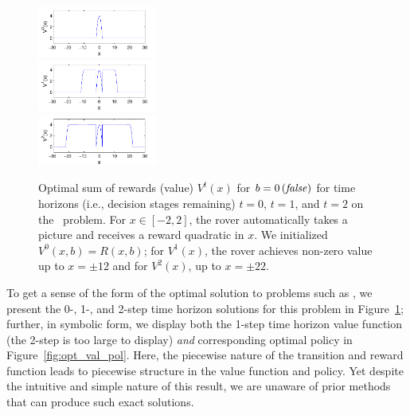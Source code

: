 \begin{figure}[t!]
\centering
\includegraphics[width=0.35\textwidth]{Figures1/v1_mr.pdf}\\
\vspace{-1mm}
\includegraphics[width=0.35\textwidth]{Figures1/v2_mr.pdf}\\
\vspace{-1mm}
\includegraphics[width=0.35\textwidth]{Figures1/v3_mr.pdf}
\vspace{-3mm}
\caption{\footnotesize Optimal sum of rewards (value) 
$V^t(x)$ for $b = 0 \, 
(\mathit{false})$ for time horizons (i.e., decision stages remaining) $t=0$,
$t=1$, and $t=2$ on the \MarsRover\ problem.  For $x \in [-2,2]$, the
rover automatically takes a picture and receives a reward quadratic in
$x$.  We initialized $V^0(x,b) = R(x,b)$; for $V^1(x)$, the rover achieves
non-zero value up to $x = \pm 12$ and for 
$V^2(x)$, up to $x = \pm 22$.}
\label{fig:opt_graph}
\vspace{-3mm}
\end{figure}

To get a sense of the form of the optimal solution to problems such as
\MarsRover, we present the 0-, 1-, and 2-step time horizon solutions
for this problem in Figure~\ref{fig:opt_graph}; further, in symbolic
form, we display both the 1-step time horizon value function (the
2-step is too large to display) \emph{and} corresponding optimal
policy in Figure~\ref{fig:opt_val_pol}.  Here, the piecewise nature of
the transition and reward function leads to piecewise
structure in the value function and policy.  Yet despite the intuitive and
simple nature of this result, we are unaware of prior methods that can
produce such exact solutions.

